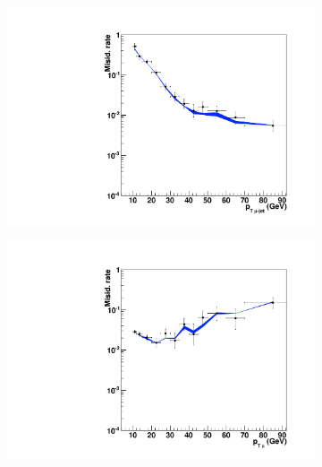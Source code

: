 \begin{figure}
        \centering
        \begin{subfigure}[b]{0.33\textwidth}
		\includegraphics[width=\textwidth]{4_Analisys/pics/8TeV/plots/fakerates/m_emt_kNN_muonJetPt.pdf}
                \caption{}
        \end{subfigure}%
        \begin{subfigure}[b]{0.33\textwidth}
                \includegraphics[width=\textwidth]{4_Analisys/pics/8TeV/plots/fakerates/m_emt_kNN_muonPt.pdf}
                \caption{}
        \end{subfigure}
        \begin{subfigure}[b]{0.33\textwidth}

\end{subfigure}
\end{figure}
